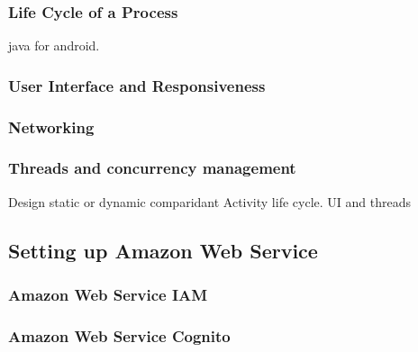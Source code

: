 \documentclass[a4paper, 11pt]{article}
\begin{document}
\subsubsection{Life Cycle of a Process}
java for android.

\subsubsection{User Interface and Responsiveness}

\subsubsection{Networking}

\subsubsection{Threads and concurrency management}
Design static or dynamic comparidant
Activity life cycle.
UI and threads

\subsection{Setting up Amazon Web Service}


\subsubsection{Amazon Web Service IAM}


\subsubsection{Amazon Web Service Cognito}
\end{document}
